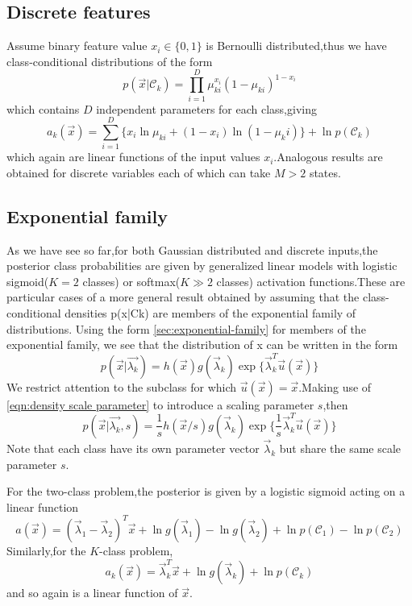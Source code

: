 \subsection{Discrete features}
Assume binary feature value $x_i\in \{0,1\}$ is Bernoulli distributed,thus we have class-conditional distributions of the form
\begin{equation}
p(\vec{x}|\mathcal{C}_k) = \prod_{i=1}^{D}\mu_{ki}^{x_i}(1-\mu_{ki})^{1-x_i}
\end{equation}
which contains $D$ independent parameters for each class,giving
\begin{equation}
a_k(\vec{x}) = \sum_{i=1}^{D}\{x_i\ln\mu_{ki}+(1-x_i)\ln(1-\mu_ki)\} + \ln p(\mathcal{C}_k)
\end{equation}
which again are linear functions of the input values $x_i$.Analogous results are obtained for discrete variables each of which can take $M>2$ states.

\subsection{Exponential family}
As we have see so far,for both Gaussian distributed and discrete inputs,the posterior class probabilities are given by generalized linear models with logistic sigmoid($K=2$ classes) or softmax($K\gg 2$ classes) activation functions.These are particular cases
of a more general result obtained by assuming that the class-conditional densities
p(x|Ck) are members of the exponential family of distributions.
Using the form  \ref{sec:exponential-family} for members of the exponential family, we see that the distribution of x can be written in the form
\begin{equation}
p(\vec{x}|\vec{\lambda_k}) = h(\vec{x})g(\vec{\lambda}_k)
\exp\{\vec{\lambda}_k^T\vec{u}(\vec{x}) \}
\end{equation}
We restrict attention to the subclass for which $\vec{u}(\vec{x})  = \vec{x}$.Making use of \ref{eqn:density scale parameter} to introduce a scaling parameter $s$,then
\begin{equation}\label{eqn:restricted exponential family}
p(\vec{x}|\vec{\lambda_k},s) = \dfrac{1}{s}h(\vec{x}/s)g(\vec{\lambda}_k)
\exp\{\dfrac{1}{s}\vec{\lambda}_k^T\vec{u}(\vec{x}) \}
\end{equation}
Note that each class have its own parameter vector $\vec{\lambda}_k$ but share the same scale parameter $s$.

For the two-class problem,the posterior is given by a logistic sigmoid acting on a linear function
\begin{equation}
a(\vec{x}) = (\vec{\lambda}_1-\vec{\lambda}_2)^T\vec{x} + \ln g(\vec{\lambda}_1) - \ln g(\vec{\lambda}_2) +\ln p(\mathcal{C}_1)-\ln p(\mathcal{C}_2)
\end{equation}
Similarly,for the $K$-class problem,
\begin{equation}
a_k(\vec{x}) = \vec{\lambda}_k^T\vec{x}+\ln g(\vec{\lambda}_k)+\ln p(\mathcal{C}_k)
\end{equation}
and so again is a linear function of $\vec{x}$.

